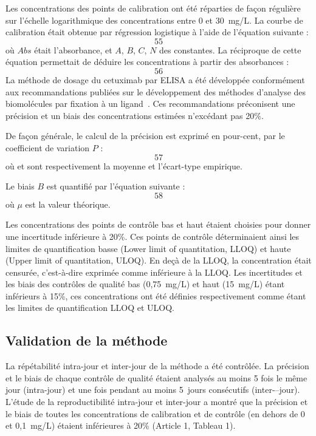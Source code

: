 Les concentrations des points de calibration ont été réparties de façon régulière sur l'échelle logarithmique des concentrations entre 0 et 30~mg/L. La courbe de calibration était obtenue par régression logistique à l'aide de l'équation suivante :
\begin{equation}
55
\end{equation}
où $Abs$ était l'absorbance, et $A$, $B$, $C$, $N$ des constantes.
La réciproque de cette équation permettait de déduire les concentrations à partir des absorbances :
\begin{equation}
56
\end{equation}
La méthode de dosage du cetuximab par ELISA a été développée conformément aux recommandations publiées sur le développement des méthodes d'analyse des biomolécules par fixation à un ligand~\citep{REF133}. Ces recommandations préconisent une précision et un biais des concentrations estimées n'excédant pas 20\%.

De façon générale, le calcul de la précision est exprimé en pour-cent, par le coefficient de variation $P$ :
\begin{equation}
57
\end{equation}
où et sont respectivement la moyenne et l'écart-type empirique.

Le biais $B$ est quantifié par l'équation suivante :
\begin{equation}
58
\end{equation}
où $\mu$ est la valeur théorique.

Les concentrations des points de contrôle bas et haut étaient choisies pour donner une incertitude inférieure à 20\%. Ces points de contrôle déterminaient ainsi les limites de quantification basse (Lower limit of quantitation, LLOQ) et haute (Upper limit of quantitation, ULOQ). En deçà de la LLOQ, la concentration était censurée, c'est-à-dire exprimée comme inférieure à la LLOQ. Les incertitudes et les biais des contrôles de qualité bas (0,75~mg/L) et haut (15~mg/L) étant inférieurs à 15\%, ces concentrations ont été définies respectivement comme étant les limites de quantification LLOQ et ULOQ.
\subsection{Validation de la méthode}
La répétabilité intra-jour et inter-jour de la méthode a été contrôlée. La précision et le biais de chaque contrôle de qualité étaient analysés au moins 5 fois le même jour (intra-jour) et une fois pendant au moins 5~jours consécutifs (inter-–jour). L'étude de la reproductibilité intra-jour et inter-jour a montré que la précision et le biais de toutes les concentrations de calibration et de contrôle (en dehors de 0 et 0,1~mg/L) étaient inférieures à 20\% (Article 1, Tableau 1).
